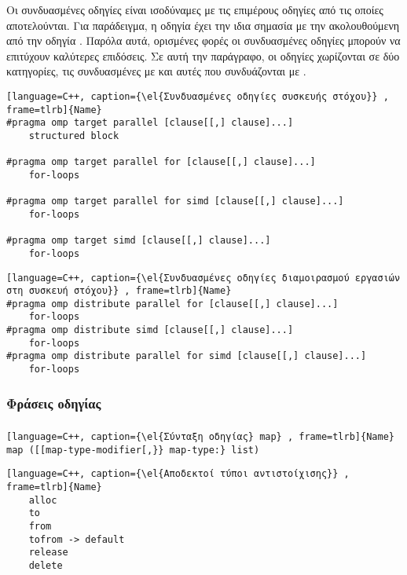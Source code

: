 Οι συνδυασμένες οδηγίες είναι ισοδύναμες με τις επιμέρους  οδηγίες από τις οποίες αποτελούνται. Για παράδειγμα, η οδηγία \emph{} έχει την ιδια σημασία με την \emph{} ακολουθούμενη από την οδηγία \emph{}. Παρόλα αυτά, ορισμένες φορές οι συνδυασμένες οδηγίες μπορούν να επιτύχουν καλύτερες επιδόσεις.
Σε αυτή την παράγραφο, οι οδηγίες χωρίζονται σε δύο κατηγορίες, τις συνδυασμένες με \emph{} και αυτές που συνδυάζονται με \emph{}.
\clearpage
{}
\begin{spacing}{1.3}
\begin{lstlisting}[language=C++, caption={\el{Συνδυασμένες οδηγίες συσκευής στόχου}} , frame=tlrb]{Name}
#pragma omp target parallel [clause[[,] clause]...]
	structured block

#pragma omp target parallel for [clause[[,] clause]...]
	for-loops
	
#pragma omp target parallel for simd [clause[[,] clause]...]
	for-loops
	
#pragma omp target simd [clause[[,] clause]...]
	for-loops
\end{lstlisting}

\begin{lstlisting}[language=C++, caption={\el{Συνδυασμένες οδηγίες διαμοιρασμού εργασιών στη συσκευή στόχου}} , frame=tlrb]{Name}
#pragma omp distribute parallel for [clause[[,] clause]...]
	for-loops
#pragma omp distribute simd [clause[[,] clause]...]
	for-loops
#pragma omp distribute parallel for simd [clause[[,] clause]...]
	for-loops
\end{lstlisting}
\end{spacing}

\subsubsection{Φράσεις οδηγίας \emph{}}
\subparagraph{}
\begin{lstlisting}[language=C++, caption={\el{Σύνταξη οδηγίας} map} , frame=tlrb]{Name}
map ([[map-type-modifier[,}} map-type:} list)

\end{lstlisting}
\begin{lstlisting}[language=C++, caption={\el{Αποδεκτοί τύποι αντιστοίχισης}} , frame=tlrb]{Name}
	alloc
	to
	from
	tofrom -> default
	release
	delete
\end{lstlisting}

